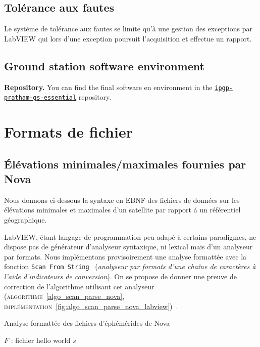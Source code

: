 \documentclass[twocolumn,pre,floats,aps,amsmath,amssymb]{revtex4}
\begin{document}
\subsection{Tol\'erance aux fautes}
Le syst\`eme de tol\'erance aux fautes se limite qu'\`a une gestion des exceptions par LabVIEW qui lors d'une exception poursuit l'acquisition et effectue un rapport.

\subsection{Ground station software environment}

\noindent
\textbf{Repository.} You can find the final software en environment in the \href{https://github.com/EmptyStackExn/ipgp-pratham-gs-essential}{\texttt{ipgp-pratham-gs-essential}} repository.

\section{Formats de fichier}
\label{sec:file_formats}

\subsection{\'El\'evations minimales/maximales fournies par Nova}

Nous donnons ci-dessous la syntaxe en EBNF des fichiers de donn\'ees sur les \'el\'evations minimales et maximales d'un satellite par rapport \'a un r\'ef\'erentiel g\'eographique.

LabVIEW, \'etant langage de programmation peu adap\'e \`a certains paradigmes, ne dispose pas de g\'en\'erateur d'analyseur syntaxique, ni lexical mais d'un analyseur par formats. Nous impl\'ementons provisoirement une analyse formatt\'ee avec la fonction \texttt{Scan From String}~\cite{NI_scan_from_string} (\textit{analyseur par formats d'une cha\^ine de caract\`eres \`a l'aide d'indicateurs de conversion}). On se propose de donner une preuve de correction de l'algorithme utilisant cet analyseur (\textsc{algorithme}~\ref{algo_scan_parse_nova}, \textsc{impl\'ementation}~\ref{fig:algo_scan_parse_nova_labview})~\cite{Knuth}.

\begin{algorithm}[h]
\caption{Analyse formatt\'ee des fichiers d'\'eph\'em\'erides de Nova}
\label{algo_scan_parse_nova}
\begin{algorithmic}[1]
  \REQUIRE $F$ : fichier
  \STATE hello world
  \RETURN $s$
\end{algorithmic}
\end{algorithm}
\end{document}

